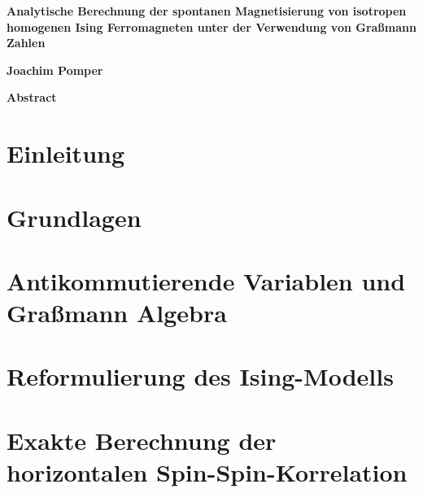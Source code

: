 \documentclass[fontsize = 12pt]{scrartcl}
\numberwithin{equation}{section}
\begin{document}
\thispagestyle{plain}
\thispagestyle{empty}
\begin{center}
    \Large
    \textbf{Analytische Berechnung der spontanen Magnetisierung von isotropen homogenen Ising Ferromagneten unter der Verwendung von Graßmann Zahlen}
        
    \vspace{0.4cm}
    \large
        
    \vspace{0.4cm}
    \textbf{Joachim Pomper}
       
    \vspace{0.9cm}
    \Large
    \textbf{Abstract}
\end{center}



\newpage
\thispagestyle{empty}
\tableofcontents
\thispagestyle{empty}

\newpage

\setcounter{page}{1}

\section{Einleitung} \label{sec: introduction}
    

\section{Grundlagen} \label{sec: fundamentals}
    

\section{Antikommutierende Variablen und Graßmann Algebra} \label{sec: grassmann}
   

\section{Reformulierung des Ising-Modells} \label{sec: reformulation}
    

\section{Exakte Berechnung der horizontalen Spin-Spin-Korrelation} \label{sec: calcC}
    
\end{document}
